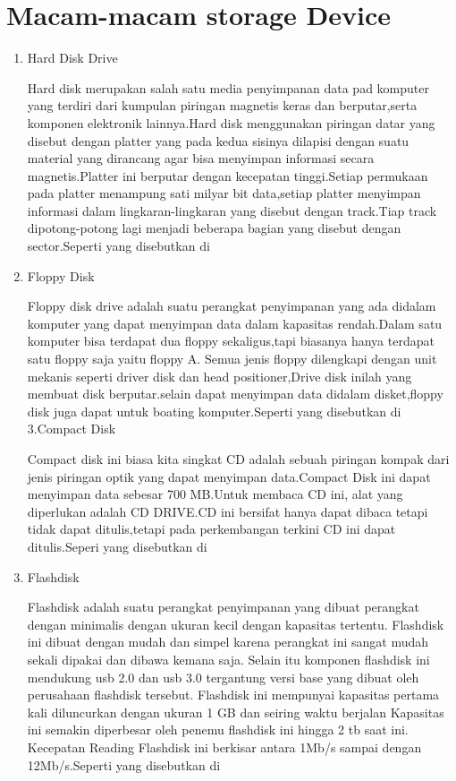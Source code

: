 \section{Macam-macam storage Device}
\begin{enumerate}
\item Hard Disk Drive

Hard disk merupakan salah satu media penyimpanan data pad komputer yang terdiri dari kumpulan piringan magnetis keras dan berputar,serta komponen elektronik lainnya.Hard disk menggunakan piringan datar yang disebut dengan platter yang pada kedua sisinya dilapisi dengan suatu material yang dirancang agar bisa menyimpan informasi secara magnetis.Platter ini berputar dengan kecepatan tinggi.Setiap permukaan pada platter menampung sati milyar bit data,setiap platter menyimpan informasi dalam lingkaran-lingkaran yang disebut dengan track.Tiap track dipotong-potong lagi menjadi beberapa bagian yang disebut dengan sector.Seperti yang disebutkan di \cite{wahyudi2005mengenal}

\item Floppy Disk

Floppy disk drive adalah suatu perangkat penyimpanan yang ada didalam komputer yang dapat menyimpan data dalam kapasitas rendah.Dalam satu komputer bisa terdapat dua floppy sekaligus,tapi biasanya hanya terdapat satu floppy saja yaitu floppy A. Semua jenis floppy dilengkapi dengan unit mekanis seperti driver disk dan head positioner,Drive disk inilah yang membuat disk berputar.selain dapat menyimpan data didalam disket,floppy disk juga dapat untuk boating komputer.Seperti yang disebutkan di \cite{horie1987floppy}
3.Compact Disk

Compact disk ini biasa kita singkat CD adalah sebuah piringan kompak dari jenis piringan optik yang dapat menyimpan data.Compact Disk ini dapat menyimpan data sebesar 700 MB.Untuk membaca CD ini, alat yang diperlukan adalah CD DRIVE.CD ini bersifat hanya dapat dibaca tetapi tidak dapat ditulis,tetapi pada perkembangan terkini CD ini dapat ditulis.Seperi yang disebutkan di \cite{ernst1998turtles}

\item Flashdisk

Flashdisk adalah suatu perangkat penyimpanan yang dibuat perangkat dengan minimalis dengan ukuran kecil dengan kapasitas tertentu. Flashdisk ini dibuat dengan
mudah dan simpel karena perangkat ini sangat mudah sekali dipakai dan dibawa kemana saja. Selain itu komponen flashdisk ini mendukung usb 2.0 dan usb 3.0 tergantung
versi base yang dibuat oleh perusahaan flashdisk tersebut. Flashdisk ini mempunyai kapasitas pertama kali diluncurkan dengan ukuran 1 GB dan seiring waktu berjalan
Kapasitas ini semakin diperbesar oleh penemu flashdisk ini hingga 2 tb saat ini. Kecepatan Reading Flashdisk ini berkisar antara 1Mb/s sampai dengan 12Mb/s.Seperti yang disebutkan di \cite{aini2010mengukur}


\end{enumerate}
